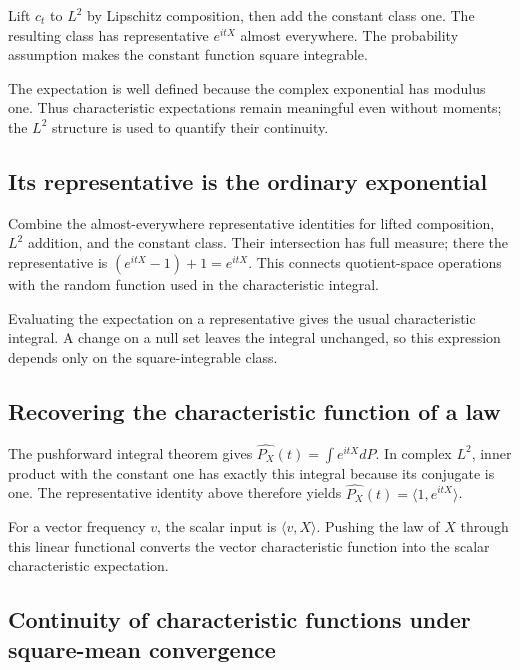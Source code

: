 \documentclass[11pt,a4paper]{article}
\begin{document}
Lift \(c_t\) to \(L^2\) by Lipschitz composition, then add the constant class one. The resulting class has representative \(e^{itX}\) almost everywhere. The probability assumption makes the constant function square integrable.



The expectation is well defined because the complex exponential has modulus one. Thus characteristic expectations remain meaningful even without moments; the \(L^2\) structure is used to quantify their continuity.


\subsection{\texorpdfstring{Its representative is the ordinary exponential}{Its representative is the ordinary exponential}}


Combine the almost-everywhere representative identities for lifted composition, \(L^2\) addition, and the constant class. Their intersection has full measure; there the representative is \((e^{itX}-1)+1=e^{itX}\). This connects quotient-space operations with the random function used in the characteristic integral.



Evaluating the expectation on a representative gives the usual characteristic integral. A change on a null set leaves the integral unchanged, so this expression depends only on the square-integrable class.


\subsection{\texorpdfstring{Recovering the characteristic function of a law}{Recovering the characteristic function of a law}}


The pushforward integral theorem gives \(\widehat{P_X}(t)=\int e^{itX}dP\). In complex \(L^2\), inner product with the constant one has exactly this integral because its conjugate is one. The representative identity above therefore yields \(\widehat{P_X}(t)=\langle1,e^{itX}\rangle\).



For a vector frequency \(v\), the scalar input is \(\langle v,X\rangle\). Pushing the law of \(X\) through this linear functional converts the vector characteristic function into the scalar characteristic expectation.


\subsection{\texorpdfstring{Continuity of characteristic functions under square-mean convergence}{Continuity of characteristic functions under square-mean convergence}}
\end{document}
